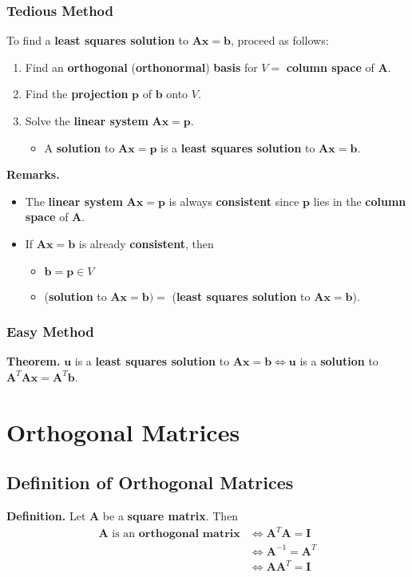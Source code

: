 \documentclass[../ma2001_notes.tex]{subfiles}
\begin{document}
\subsubsection{Tedious Method}
To find a \textbf{least squares solution} to \(\bm{Ax}=\bm{b}\), proceed as follows:
\begin{enumerate}
	\item Find an \textbf{orthogonal} (\textbf{orthonormal}) \textbf{basis} for \(V=\) \textbf{column space} of \(\bm{A}\).
	\item Find the \textbf{projection} \(\bm{p}\) of \(\bm{b}\) onto \(V\).
	\item Solve the \textbf{linear system} \(\bm{Ax}=\bm{p}\).
	\begin{itemize}
		\item A \textbf{solution} to \(\bm{Ax}=\bm{p}\) is a \textbf{least squares solution} to \(\bm{Ax}=\bm{b}\). 
	\end{itemize}
\end{enumerate}
\textbf{Remarks.}
\begin{itemize}
	\item The \textbf{linear system} \(\bm{Ax}=\bm{p}\) is always \textbf{consistent} since \(\bm{p}\) lies in the \textbf{column space} of \(\bm{A}\).
	\item If \(\bm{Ax}=\bm{b}\) is already \textbf{consistent}, then
	\begin{itemize}
		\item\(\bm{b}=\bm{p}\in V\)
		\item(\textbf{solution} to \(\bm{Ax}=\bm{b})=\) (\textbf{least squares solution} to \(\bm{Ax}=\bm{b}\)).
	\end{itemize}
\end{itemize}

\subsubsection{Easy Method}
\textbf{Theorem.} \(\bm{u}\) is a \textbf{least squares solution} to \(\bm{Ax}=\bm{b}\Leftrightarrow\bm{u}\) is a \textbf{solution} to \(\bm{A}^T\bm{Ax}=\bm{A}^T\bm{b}\).

\section{Orthogonal Matrices}
\subsection{Definition of Orthogonal Matrices}
\textbf{Definition.} Let \(\bm{A}\) be a \textbf{square matrix}. Then
\begin{align*}
	\bm{A}\text{ is an }\textbf{orthogonal matrix}
	&\Leftrightarrow\bm{A}^T\bm{A}=\bm{I} \\
	&\Leftrightarrow\bm{A}^{-1}=\bm{A}^T \\
	&\Leftrightarrow\bm{AA}^T=\bm{I}
\end{align*}
\end{document}
